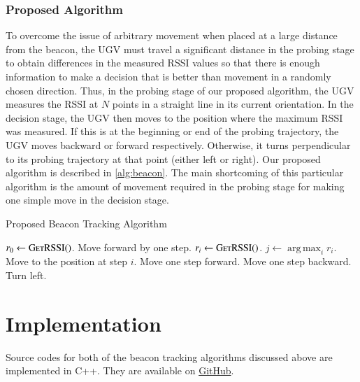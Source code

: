 \documentclass[conference]{IEEEtran}
\DeclareMathOperator*{\argmax}{arg\,max}
\begin{document}
\subsubsection{Proposed Algorithm}
\label{subsubsec:proposed-algorithm}

To overcome the issue of arbitrary movement when placed at a large distance from
the beacon, the UGV must travel a significant distance in the probing stage to
obtain differences in the measured RSSI values so that there is enough
information to make a decision that is better than movement in a randomly chosen
direction. Thus, in the probing stage of our proposed algorithm, the UGV
measures the RSSI at \(N\) points in a straight line in its current orientation.
In the decision stage, the UGV then moves to the position where the maximum RSSI
was measured. If this is at the beginning or end of the probing trajectory, the
UGV moves backward or forward respectively. Otherwise, it turns perpendicular to
its probing trajectory at that point (either left or right). Our proposed
algorithm is described in \autoref{alg:beacon}. The main shortcoming of this
particular algorithm is the amount of movement required in the probing stage for
making one simple move in the decision stage.

\begin{algorithm}[H]
    \caption{Proposed Beacon Tracking Algorithm}
    \label{alg:beacon}
    \begin{algorithmic}[1]
            \State \(r_0 \gets \textsc{GetRSSI()}\).
                \State Move forward by one step.
                \State \(r_i \gets \textsc{GetRSSI()}\).
            \EndFor
            \State \(j \gets \argmax_{i} r_i\).
            \State Move to the position at step \(i\).
                \State Move one step forward.
                \State Move one step backward.
            \Else
                \State Turn left.
            \EndIf
        \EndWhile
    \end{algorithmic}
\end{algorithm}

\section{Implementation}
\label{sec:implementation}

Source codes for both of the beacon tracking algorithms discussed above are
implemented in C++. They are available on
\href{https://github.com/goats-9/ee2802/main/ugv-beacon/codes}{GitHub}.
\end{document}
